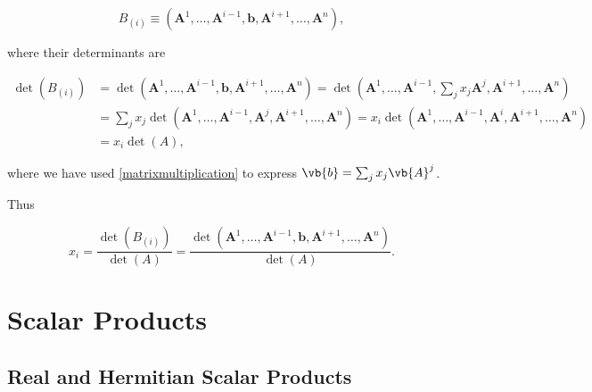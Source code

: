 \documentclass[a4paper,12pt]{report}
\begin{document}
\begin{equation}
B_{(i)} \equiv  (\mathbf{A}^1, \ldots, \mathbf{A}^{i-1}, \mathbf{b}, \mathbf{A}^{i+1}, \ldots, \mathbf{A}^n), 
\end{equation}

where their determinants are

\begin{equation}
\begin{aligned}
\det(B_{(i)}) &= \det(\mathbf{A}^1, \ldots, \mathbf{A}^{i-1}, \mathbf{b}, \mathbf{A}^{i+1}, \ldots, \mathbf{A}^n) = \det(\mathbf{A}^1, \ldots, \mathbf{A}^{i-1}, \sum_{j} x_j \mathbf{A}^j, \mathbf{A}^{i+1}, \ldots, \mathbf{A}^n) \\
&= \sum_{j} x_j \det(\mathbf{A}^1, \ldots, \mathbf{A}^{i-1}, \mathbf{A}^j, \mathbf{A}^{i+1}, \ldots, \mathbf{A}^n) = x_i \det(\mathbf{A}^1, \ldots, \mathbf{A}^{i-1}, \mathbf{A}^i, \mathbf{A}^{i+1}, \ldots, \mathbf{A}^n) \\
&= x_i \det(A),
\end{aligned}
\end{equation}

where we have used \cref{matrixmultiplication} to express \(\vb{b}  = \sum_{j}^{} x_{j}\vb{A} ^{j}  \).  

Thus

\begin{equation}
x_i = \frac{\det(B_{(i)})}{\det(A)} = \frac{\det(\mathbf{A}^1, \ldots, \mathbf{A}^{i-1}, \mathbf{b}, \mathbf{A}^{i+1}, \ldots, \mathbf{A}^n)}{\det(A)} .
\end{equation}









\chapter{Scalar Products} \label{dot} 

\section{Real and Hermitian Scalar Products}
\end{document}
